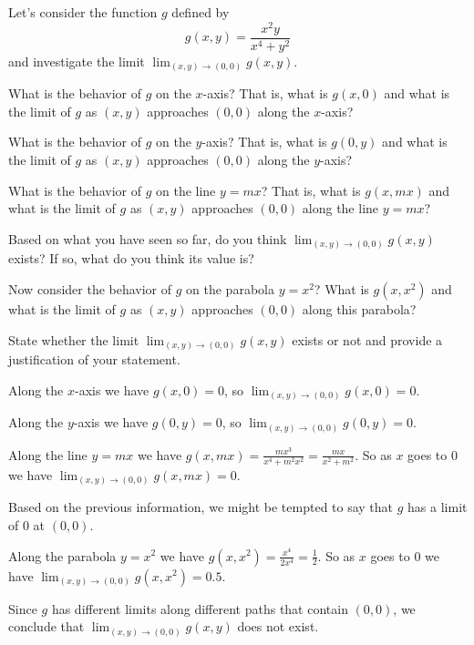 \begin{activity} \label{A:10.1.2}  Let's consider the function $g$ defined by 
  $$g(x,y) = \frac{x^2y}{x^4 + y^2}$$
  and investigate the limit $\lim_{(x,y)\to(0,0)}g(x,y)$.

  \ba
\item What is the behavior of $g$ on the $x$-axis?  That is, what is
  $g(x,0)$ and what is the limit of $g$ as $(x,y)$ approaches $(0,0)$
  along the $x$-axis?

\item What is the behavior of $g$ on the $y$-axis?  That is, what is
  $g(0,y)$ and what is the limit of $g$ as $(x,y)$ approaches $(0,0)$
  along the $y$-axis?

\item What is the behavior of $g$ on the line $y=mx$?  That is, what
  is $g(x,mx)$ and what is the limit of $g$ as $(x,y)$ approaches $(0,0)$
  along the line $y=mx$?

\item Based on what you have seen so far, do you think
  $\lim_{(x,y)\to(0,0)}g(x,y)$ exists?  If so, what do you think its
    value is?

\item Now consider the behavior of $g$ on the parabola $y=x^2$?  What
  is $g(x,x^2)$ and what is the limit of $g$ as $(x,y)$ approaches
  $(0,0)$ along this parabola?

\item State whether the limit $\lim_{(x,y)\to(0,0)} g(x,y)$ exists or
  not and provide a justification of your statement.



  \ea


\end{activity}

\begin{activitySolution}
\ba
\item Along the $x$-axis we have $g(x,0) = 0$, so $\lim_{(x,y) \to (0,0)} g(x,0) = 0$. 
\item Along the $y$-axis we have $g(0,y) = 0$, so $\lim_{(x,y) \to (0,0)} g(0,y) = 0$.
\item Along the line $y=mx$ we have $g(x,mx) = \frac{mx^3}{x^4 + m^2x^2} = \frac{mx}{x^2+m^2}$. So as $x$ goes to $0$ we have $\lim_{(x,y) \to (0,0)} g(x,mx) = 0$.
\item Based on the previous information, we might be tempted to say that $g$ has a limit of $0$ at $(0,0)$.  
\item Along the parabola $y=x^2$ we have $g(x,x^2) = \frac{x^4}{2x^4} = \frac{1}{2}$. So as $x$ goes to $0$ we have $\lim_{(x,y) \to (0,0)} g(x,x^2) = 0.5$.
\item Since $g$ has different limits along different paths that contain $(0,0)$, we conclude that $\lim_{(x,y) \to (0,0)} g(x,y)$ does not exist. 
\ea
\end{activitySolution}

\aftera
